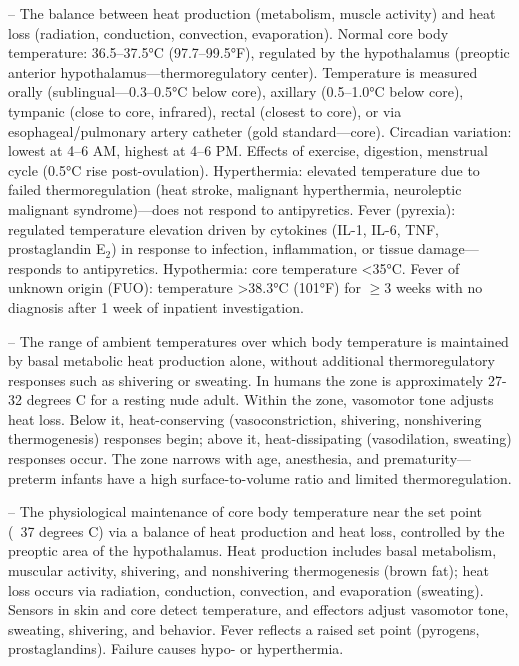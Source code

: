 -- The balance between heat production (metabolism, muscle activity) and heat loss (radiation, conduction, convection, evaporation). Normal core body temperature: 36.5--37.5°C (97.7--99.5°F), regulated by the hypothalamus (preoptic anterior hypothalamus—thermoregulatory center). Temperature is measured orally (sublingual—0.3--0.5°C below core), axillary (0.5--1.0°C below core), tympanic (close to core, infrared), rectal (closest to core), or via esophageal/pulmonary artery catheter (gold standard—core). Circadian variation: lowest at 4--6 AM, highest at 4--6 PM. Effects of exercise, digestion, menstrual cycle (0.5°C rise post-ovulation). Hyperthermia: elevated temperature due to failed thermoregulation (heat stroke, malignant hyperthermia, neuroleptic malignant syndrome)—does not respond to antipyretics. Fever (pyrexia): regulated temperature elevation driven by cytokines (IL-1, IL-6, TNF, prostaglandin E$_2$) in response to infection, inflammation, or tissue damage—responds to antipyretics. Hypothermia: core temperature <35°C. Fever of unknown origin (FUO): temperature >38.3°C (101°F) for \(\ge\)3 weeks with no diagnosis after 1 week of inpatient investigation.

-- The range of ambient temperatures over which body temperature is maintained by basal metabolic heat production alone, without additional thermoregulatory responses such as shivering or sweating. In humans the zone is approximately 27-32 degrees C for a resting nude adult. Within the zone, vasomotor tone adjusts heat loss. Below it, heat-conserving (vasoconstriction, shivering, nonshivering thermogenesis) responses begin; above it, heat-dissipating (vasodilation, sweating) responses occur. The zone narrows with age, anesthesia, and prematurity—preterm infants have a high surface-to-volume ratio and limited thermoregulation.

-- The physiological maintenance of core body temperature near the set point (~37 degrees C) via a balance of heat production and heat loss, controlled by the preoptic area of the hypothalamus. Heat production includes basal metabolism, muscular activity, shivering, and nonshivering thermogenesis (brown fat); heat loss occurs via radiation, conduction, convection, and evaporation (sweating). Sensors in skin and core detect temperature, and effectors adjust vasomotor tone, sweating, shivering, and behavior. Fever reflects a raised set point (pyrogens, prostaglandins). Failure causes hypo- or hyperthermia.

